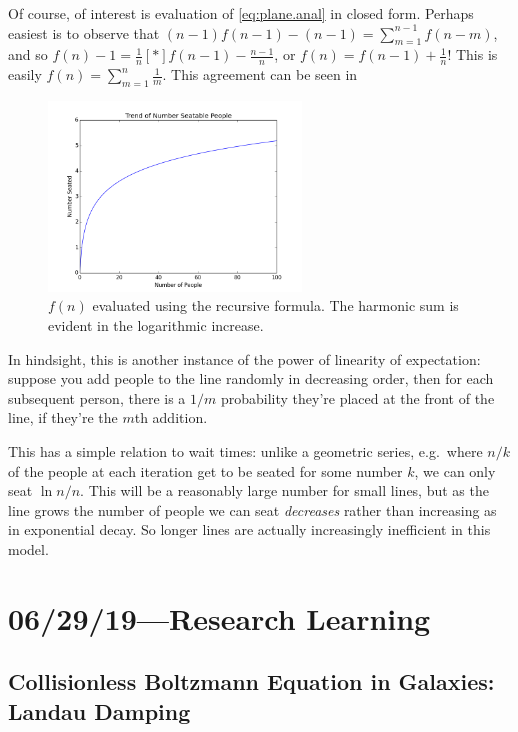 \documentclass[12pt]{report}
\newcommand*{\s}[1]{\left[#1\right]}
\begin{document}
Of course, of interest is evaluation of \autoref{eq:plane.anal} in closed form.
Perhaps easiest is to observe that $(n - 1)f(n - 1) - (n - 1) = \sum\limits_{m =
1}^{n - 1}f(n - m)$, and so $f(n) - 1 = \frac{1}{n}\s*{f(n - 1) - \frac{n -
1}{n}}$, or $f(n) = f(n - 1) + \frac{1}{n}$! This is easily $f(n) =
\sum\limits_{m = 1}^n \frac{1}{m}$. This agreement can be seen in
\begin{figure}[t]
    \centering
    \includegraphics[width=0.6\textwidth]{plane_boarding/seating_trend.png}
    \caption{$f(n)$ evaluated using the recursive formula. The harmonic sum is
    evident in the logarithmic increase.}\label{fig:plane.trend}
\end{figure}

In hindsight, this is another instance of the power of linearity of expectation:
suppose you add people to the line randomly in decreasing order, then for each
subsequent person, there is a $1/m$ probability they're placed at the front of
the line, if they're the $m$th addition.

This has a simple relation to wait times: unlike a geometric series, e.g.\ where
$n/k$ of the people at each iteration get to be seated for some number $k$, we
can only seat $\ln n / n$. This will be a reasonably large number for small
lines, but as the line grows the number of people we can seat \emph{decreases}
rather than increasing as in exponential decay. So longer lines are actually
increasingly inefficient in this model.

\chapter{06/29/19---Research Learning}

\section{Collisionless Boltzmann Equation in Galaxies: Landau Damping}
\end{document}
